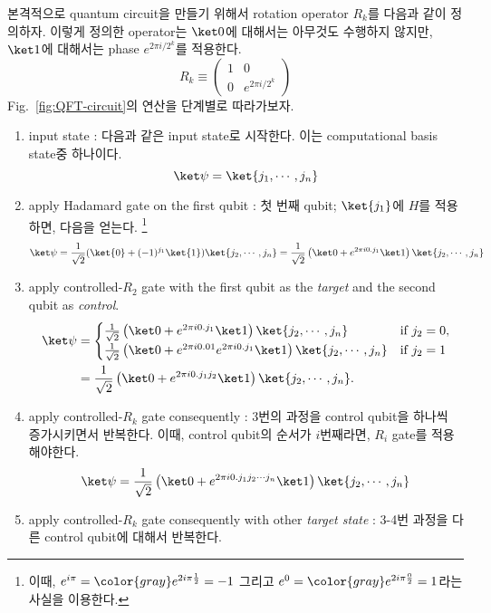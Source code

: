 \vspace{1em}
본격적으로 quantum circuit을 만들기 위해서 rotation operator $R_k$를 다음과 같이 정의하자. 이렇게 정의한 operator는 $\ket 0$에 대해서는 아무것도 수행하지 않지만, $\ket 1$에 대해서는 phase $e^{2\pi i / 2^k}$를 적용한다.
\begin{equation*}
  R_k \equiv\left(\begin{array}{cc}
  1 & 0 \\
  0 & e^{2 \pi i / 2^k}
  \end{array}\right)
\end{equation*}
Fig.~\ref{fig:QFT-circuit}의 연산을 단계별로 따라가보자.
\begin{enumerate}
  \item input state : 다음과 같은 input state로 시작한다. 이는 computational basis state중 하나이다.
  \begin{equation*}
    \ket \psi = \ket{j_1,\cdots, j_n}
  \end{equation*}
  \item apply Hadamard gate on the first qubit : 첫 번째 qubit; $\ket{j_1}$에 $H$를 적용하면, 다음을 얻는다.
  \footnote{이때, $e^{i\pi} = {\color{gray}e^{2i\pi \frac{1}{2}}} = -1$ 그리고 $e^{0} = {\color{gray}e^{2i\pi \frac{0}{2}}} = 1$라는 사실을 이용한다.}
  \begin{equation*}
    \ket \psi = \frac{1}{\sqrt 2} (\ket{0} + (-1)^{j_1}\ket{1})\ket{j_2, \cdots, j_n} = \frac{1}{\sqrt 2} \left( \ket 0 + e^{2\pi i 0.j_1} \ket 1 \right) \ket{j_2, \cdots, j_n}
  \end{equation*}
  \item apply controlled-$R_2$ gate with the first qubit as the \textit{target} and the second qubit as \textit{control}.
  \begin{align*}
    \ket \psi &= \begin{cases} 
        \frac{1}{\sqrt 2} \left( \ket 0 + e^{2\pi i 0.j_1} \ket 1 \right) \ket{j_2, \cdots, j_n} & \text{if } j_2 = 0, \\ 
        \frac{1}{\sqrt 2} \left( \ket 0 + e^{2\pi i 0.01} e^{2\pi i 0.j_1} \ket 1 \right) \ket{j_2, \cdots, j_n} & \text{if } j_2 = 1 
    \end{cases}\\ 
              &= \frac{1}{\sqrt 2} \left( \ket 0 + e^{2\pi i 0.j_1j_2} \ket 1 \right) \ket{j_2, \cdots, j_n}.
\end{align*}
\newpage
  \item apply controlled-$R_k$ gate consequently : 3번의 과정을 control qubit을 하나씩 증가시키면서 반복한다. 이때, control qubit의 순서가 $i$번째라면, $R_i$ gate를 적용해야한다.
  \begin{equation*}
    \ket \psi = \frac{1}{\sqrt 2} \left( \ket 0 + e^{2\pi i 0.j_1j_2 \cdots j_n} \ket 1 \right) \ket{j_2, \cdots, j_n} 
  \end{equation*}
  \item apply controlled-$R_k$ gate consequently with other \textit{target state}  : 3-4번 과정을 다른 control qubit에 대해서 반복한다. 
  

\end{enumerate}
